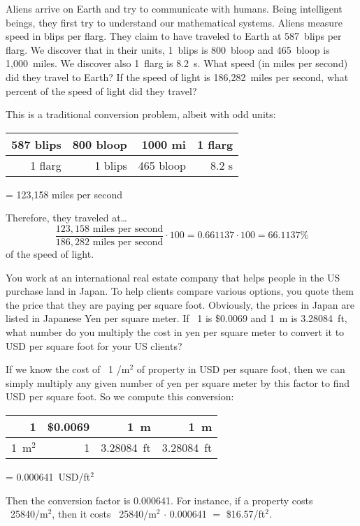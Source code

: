 \documentclass[11pt,letterpaper]{article}
\begin{document}
\newpage



 Aliens arrive on Earth and try to communicate with humans. Being intelligent beings, they first try to understand our mathematical systems. Aliens measure speed in blips per flarg. They claim to have traveled to Earth at 587~blips per flarg. We discover that in their units, 1~blips is 800~bloop and 465~bloop is 1,000~miles. We discover also 1~flarg is 8.2~s. What speed (in miles per second) did they travel to Earth? If the speed of light is 186,282~miles per second, what percent of the speed of light did they travel? \pspace

\sol This is a traditional conversion problem, albeit with odd units: \par
	\begin{table}[!ht]
	\centering
	\begin{tabular}{r|r|r|r}
	587 blips	& 800 bloop & 1000 mi     & 1 flarg \\ \hline
	1 flarg	& 1 blips      & 465 bloop  & 8.2 s
	\end{tabular}
	= 123,158 miles per second
	\end{table} \par
Therefore, they traveled at\dots
	\[
	\dfrac{123,158 \text{ miles per second}}{186,282 \text{ miles per second}} \cdot 100= 0.661137 \cdot 100= 66.1137\%
	\]
of the speed of light.



\newpage



 You work at an international real estate company that helps people in the US purchase land in Japan. To help clients compare various options, you quote them the price that they are paying per square foot. Obviously, the prices in Japan are listed in Japanese Yen per square meter. If \textyen\ 1 is \$0.0069 and 1~m is 3.28084~ft, what number do you multiply the cost in yen per square meter to convert it to USD per square foot for your US clients? \pspace

\sol If we know the cost of \textyen\ 1 /m$^2$ of property in USD per square foot, then we can simply multiply any given number of yen per square meter by this factor to find USD per square foot. So we compute this conversion: \par
	\begin{table}[!ht]
	\centering
	\begin{tabular}{r|r|r|r}
	\textyen\ 1 & \$0.0069      & 1~m           & 1~m \\ \hline
	1~m$^2$	  & \textyen\ 1  & 3.28084~ft & 3.28084~ft
	\end{tabular}
	= 0.000641~USD/ft$^2$
	\end{table} \par
Then the conversion factor is 0.000641. For instance, if a property costs \textyen\ 25840/m$^2$, then it costs \textyen\ 25840/m$^2$ $\cdot$ 0.000641 $=$ \$16.57/ft$^2$. 
\end{document}
